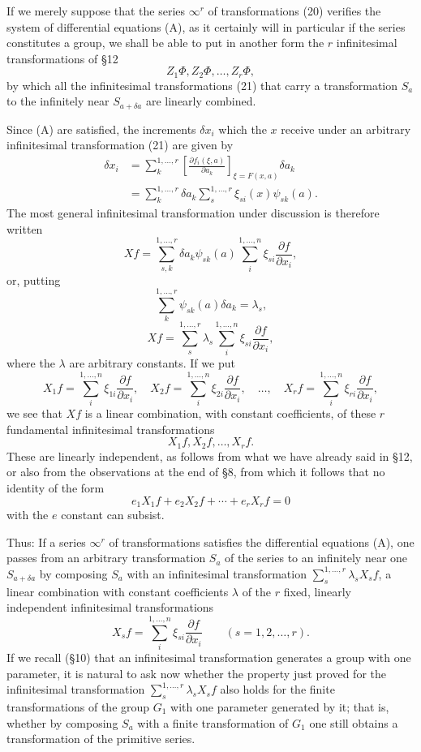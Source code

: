 \documentclass[11pt]{book}
\begin{document}
If we merely suppose that the series $\infty^r$ of transformations (20) verifies the system of differential equations (A), as it certainly will in particular if the series constitutes a group, we shall be able to put in another form the $r$ infinitesimal transformations of \S{}12
\[
 Z_1\Phi,
 Z_2\Phi,
 \ldots,
 Z_r\Phi,
\]
by which all the infinitesimal transformations (21) that carry a transformation $S_a$ to the infinitely near $S_{a+\delta a}$ are linearly combined.

Since (A) are satisfied, the increments $\delta x_i$ which the $x$ receive under an arbitrary infinitesimal transformation (21) are given by
\[
\begin{aligned}
 \delta x_i
 &=\sum\limits_k^{1,\ldots,r}\left[\frac{\partial f_i(\xi,a)}{\partial a_k}\right]_{\xi=F(x,a)}\delta a_k\\
 &=\sum\limits_k^{1,\ldots,r}\delta a_k\sum\limits_s^{1,\ldots,r}\xi_{si}(x)\psi_{sk}(a).
\end{aligned}
\]
The most general infinitesimal transformation under discussion is therefore written
\[
 Xf=\sum\limits_{s,k}^{1,\ldots,r}\delta a_k\psi_{sk}(a)\sum\limits_i^{1,\ldots,n}\xi_{si}\frac{\partial f}{\partial x_i},
\]
or, putting
\[
 \sum\limits_k^{1,\ldots,r}\psi_{sk}(a)\delta a_k=\lambda_s,
\]
\[
 Xf=\sum\limits_s^{1,\ldots,r}\lambda_s\sum\limits_i^{1,\ldots,n}\xi_{si}\frac{\partial f}{\partial x_i},
\]
where the $\lambda$ are arbitrary constants. If we put
\begin{equation*}\tag{31}
 X_1f=\sum\limits_i^{1,\ldots,n}\xi_{1i}\frac{\partial f}{\partial x_i},\quad
 X_2f=\sum\limits_i^{1,\ldots,n}\xi_{2i}\frac{\partial f}{\partial x_i},\quad \ldots,\quad
 X_rf=\sum\limits_i^{1,\ldots,n}\xi_{ri}\frac{\partial f}{\partial x_i},
\end{equation*}
we see that $Xf$ is a linear combination, with constant coefficients, of these $r$ fundamental infinitesimal transformations
\[
 X_1f,
 X_2f,
 \ldots,
 X_rf.
\]
These are linearly independent, as follows from what we have already said in \S{}12, or also from the observations at the end of \S{}8, from which it follows that no identity of the form
\[
 e_1X_1f+e_2X_2f+\cdots+e_rX_rf=0
\]
with the $e$ constant can subsist.

Thus: If a series $\infty^r$ of transformations satisfies the differential equations (A), one passes from an arbitrary transformation $S_a$ of the series to an infinitely near one $S_{a+\delta a}$ by composing $S_a$ with an infinitesimal transformation $\sum\limits_s^{1,\ldots,r}\lambda_sX_sf$, a linear combination with constant coefficients $\lambda$ of the $r$ fixed, linearly independent infinitesimal transformations
\[
 X_sf=\sum\limits_i^{1,\ldots,n}\xi_{si}\frac{\partial f}{\partial x_i}\qquad(s=1,2,\ldots,r).
\]
If we recall (\S{}10) that an infinitesimal transformation generates a group with one parameter, it is natural to ask now whether the property just proved for the infinitesimal transformation $\sum\limits_s^{1,\ldots,r}\lambda_sX_sf$ also holds for the finite transformations of the group $G_1$ with one parameter generated by it; that is, whether by composing $S_a$ with a finite transformation of $G_1$ one still obtains a transformation of the primitive series.
\end{document}
